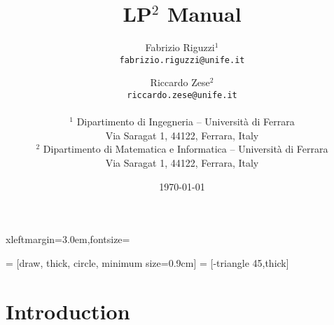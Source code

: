 \documentclass{article}
\begin{document}
 {xleftmargin=3.0em,fontsize=\small}

\newenvironment{pflcode}
  {\VerbatimEnvironment \setstretch{0.8} \begin{pflcodeve}}
  {\end{pflcodeve} }

\newcommand{\true}             {\mathtt{t}}
\newcommand{\false}            {\mathtt{f}}
\newcommand{\pathsep}          { $\triangleright$ }
\newcommand{\tableline}        {\noalign{\hrule height 0.8pt}}
\newcommand{\optionsection}[1] {\subsection*{\texttt{#1}}}

   = [draw, thick, circle, minimum size=0.9cm]
 = [-triangle 45,thick]

\setlength{\parskip}{\baselineskip}

\title{\Huge\textbf{LP$^2$ Manual}}

\author{Fabrizio Riguzzi$^1$ \\\texttt{fabrizio.riguzzi@unife.it} \and Riccardo Zese$^2$\\\texttt{riccardo.zese@unife.it}\\\\
$^1$ Dipartimento di Ingegneria -- Universit\`a di Ferrara\\
Via Saragat 1, 44122, Ferrara, Italy  \\
$^2$ Dipartimento di Matematica e Informatica -- Universit\`a di Ferrara\\
Via Saragat 1, 44122, Ferrara, Italy  \\
}


\date{\today}

\maketitle
\thispagestyle{empty}
\vspace{5cm}

\newpage



\section{Introduction}
\end{document}
